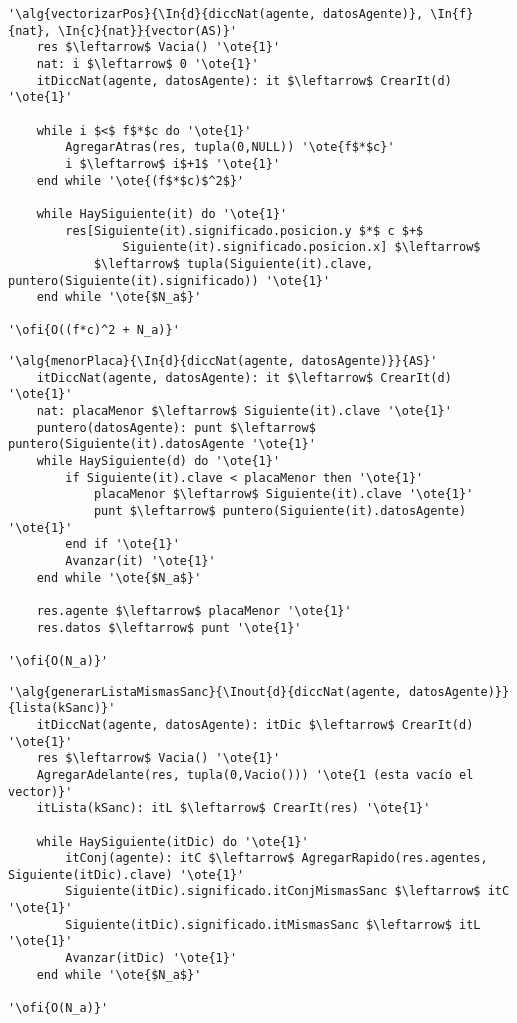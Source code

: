 \begin{lstlisting}[mathescape]
'\alg{vectorizarPos}{\In{d}{diccNat(agente, datosAgente)}, \In{f}{nat}, \In{c}{nat}}{vector(AS)}'
	res $\leftarrow$ Vacia() '\ote{1}'
	nat: i $\leftarrow$ 0 '\ote{1}'
	itDiccNat(agente, datosAgente): it $\leftarrow$ CrearIt(d) '\ote{1}'

	while i $<$ f$*$c do '\ote{1}'
		AgregarAtras(res, tupla(0,NULL)) '\ote{f$*$c}'
		i $\leftarrow$ i$+1$ '\ote{1}'
	end while '\ote{(f$*$c)$^2$}'
	
	while HaySiguiente(it) do '\ote{1}'
		res[Siguiente(it).significado.posicion.y $*$ c $+$ 
				Siguiente(it).significado.posicion.x] $\leftarrow$
			$\leftarrow$ tupla(Siguiente(it).clave, puntero(Siguiente(it).significado)) '\ote{1}'
	end while '\ote{$N_a$}'

'\ofi{O((f*c)^2 + N_a)}'
\end{lstlisting}

\begin{lstlisting}[mathescape]
'\alg{menorPlaca}{\In{d}{diccNat(agente, datosAgente)}}{AS}'
	itDiccNat(agente, datosAgente): it $\leftarrow$ CrearIt(d) '\ote{1}'
	nat: placaMenor $\leftarrow$ Siguiente(it).clave '\ote{1}'
	puntero(datosAgente): punt $\leftarrow$ puntero(Siguiente(it).datosAgente '\ote{1}'
	while HaySiguiente(d) do '\ote{1}'
		if Siguiente(it).clave < placaMenor	then '\ote{1}'
			placaMenor $\leftarrow$ Siguiente(it).clave '\ote{1}'
			punt $\leftarrow$ puntero(Siguiente(it).datosAgente) '\ote{1}'
		end if '\ote{1}'
		Avanzar(it) '\ote{1}'
	end while '\ote{$N_a$}'
	
	res.agente $\leftarrow$ placaMenor '\ote{1}'
	res.datos $\leftarrow$ punt '\ote{1}'

'\ofi{O(N_a)}'
\end{lstlisting}

\begin{lstlisting}[mathescape]
'\alg{generarListaMismasSanc}{\Inout{d}{diccNat(agente, datosAgente)}}{lista(kSanc)}'
	itDiccNat(agente, datosAgente): itDic $\leftarrow$ CrearIt(d) '\ote{1}'
	res $\leftarrow$ Vacia() '\ote{1}'
	AgregarAdelante(res, tupla(0,Vacio())) '\ote{1 (esta vacío el vector)}'
	itLista(kSanc): itL $\leftarrow$ CrearIt(res) '\ote{1}'

	while HaySiguiente(itDic) do '\ote{1}'
		itConj(agente): itC $\leftarrow$ AgregarRapido(res.agentes, Siguiente(itDic).clave) '\ote{1}'
		Siguiente(itDic).significado.itConjMismasSanc $\leftarrow$ itC '\ote{1}'
		Siguiente(itDic).significado.itMismasSanc $\leftarrow$ itL '\ote{1}'
		Avanzar(itDic) '\ote{1}'
	end while '\ote{$N_a$}'

'\ofi{O(N_a)}'
\end{lstlisting}


